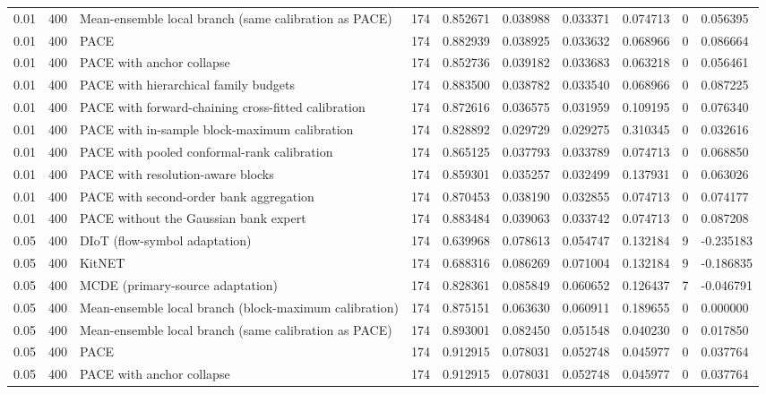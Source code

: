 \begin{tabular}{llllllllll}
0.01 & 400 & Mean-ensemble local branch (same calibration as PACE) & 174 & 0.852671 & 0.038988 & 0.033371 & 0.074713 & 0 & 0.056395 \\
0.01 & 400 & PACE & 174 & 0.882939 & 0.038925 & 0.033632 & 0.068966 & 0 & 0.086664 \\
0.01 & 400 & PACE with anchor collapse & 174 & 0.852736 & 0.039182 & 0.033683 & 0.063218 & 0 & 0.056461 \\
0.01 & 400 & PACE with hierarchical family budgets & 174 & 0.883500 & 0.038782 & 0.033540 & 0.068966 & 0 & 0.087225 \\
0.01 & 400 & PACE with forward-chaining cross-fitted calibration & 174 & 0.872616 & 0.036575 & 0.031959 & 0.109195 & 0 & 0.076340 \\
0.01 & 400 & PACE with in-sample block-maximum calibration & 174 & 0.828892 & 0.029729 & 0.029275 & 0.310345 & 0 & 0.032616 \\
0.01 & 400 & PACE with pooled conformal-rank calibration & 174 & 0.865125 & 0.037793 & 0.033789 & 0.074713 & 0 & 0.068850 \\
0.01 & 400 & PACE with resolution-aware blocks & 174 & 0.859301 & 0.035257 & 0.032499 & 0.137931 & 0 & 0.063026 \\
0.01 & 400 & PACE with second-order bank aggregation & 174 & 0.870453 & 0.038190 & 0.032855 & 0.074713 & 0 & 0.074177 \\
0.01 & 400 & PACE without the Gaussian bank expert & 174 & 0.883484 & 0.039063 & 0.033742 & 0.074713 & 0 & 0.087208 \\
0.05 & 400 & DIoT (flow-symbol adaptation) & 174 & 0.639968 & 0.078613 & 0.054747 & 0.132184 & 9 & -0.235183 \\
0.05 & 400 & KitNET & 174 & 0.688316 & 0.086269 & 0.071004 & 0.132184 & 9 & -0.186835 \\
0.05 & 400 & MCDE (primary-source adaptation) & 174 & 0.828361 & 0.085849 & 0.060652 & 0.126437 & 7 & -0.046791 \\
0.05 & 400 & Mean-ensemble local branch (block-maximum calibration) & 174 & 0.875151 & 0.063630 & 0.060911 & 0.189655 & 0 & 0.000000 \\
0.05 & 400 & Mean-ensemble local branch (same calibration as PACE) & 174 & 0.893001 & 0.082450 & 0.051548 & 0.040230 & 0 & 0.017850 \\
0.05 & 400 & PACE & 174 & 0.912915 & 0.078031 & 0.052748 & 0.045977 & 0 & 0.037764 \\
0.05 & 400 & PACE with anchor collapse & 174 & 0.912915 & 0.078031 & 0.052748 & 0.045977 & 0 & 0.037764 \\

\end{tabular}
